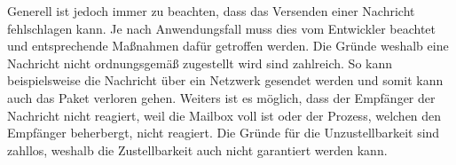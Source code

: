 Generell ist jedoch immer zu beachten, dass das Versenden einer Nachricht fehlschlagen kann. Je nach Anwendungsfall muss dies vom Entwickler beachtet  und entsprechende Maßnahmen dafür getroffen werden. Die Gründe weshalb eine Nachricht nicht ordnungsgemäß zugestellt wird sind zahlreich. So kann beispielsweise die Nachricht über ein Netzwerk gesendet werden und somit kann auch das Paket verloren gehen. Weiters ist es möglich, dass der Empfänger der Nachricht nicht reagiert, weil die Mailbox voll ist oder der Prozess, welchen den Empfänger beherbergt, nicht reagiert. Die Gründe für die Unzustellbarkeit sind zahllos, weshalb die Zustellbarkeit auch nicht garantiert werden kann. \citep{messagedeliveryreliabilityakkadocumentation}







 